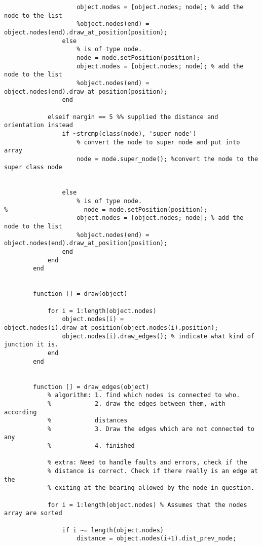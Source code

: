 \begin{lstlisting}
                    object.nodes = [object.nodes; node]; % add the node to the list
                    %object.nodes(end) = object.nodes(end).draw_at_position(position);
                else
                    % is of type node.
                    node = node.setPosition(position);
                    object.nodes = [object.nodes; node]; % add the node to the list
                    %object.nodes(end) = object.nodes(end).draw_at_position(position);
                end
                
            elseif nargin == 5 %% supplied the distance and orientation instead
                if ~strcmp(class(node), 'super_node')
                    % convert the node to super node and put into array
                    node = node.super_node(); %convert the node to the super class node
                    
                                    
                else
                    % is of type node.
%                     node = node.setPosition(position);
                    object.nodes = [object.nodes; node]; % add the node to the list
                    %object.nodes(end) = object.nodes(end).draw_at_position(position);
                end 
            end
        end
              
                
        function [] = draw(object)
            
            for i = 1:length(object.nodes)
                object.nodes(i) = object.nodes(i).draw_at_position(object.nodes(i).position);
                object.nodes(i).draw_edges(); % indicate what kind of junction it is.
            end
        end
        
        
        function [] = draw_edges(object)
            % algorithm: 1. find which nodes is connected to who.
            %            2. draw the edges between them, with according
            %            distances
            %            3. Draw the edges which are not connected to any
            %            4. finished
            
            % extra: Need to handle faults and errors, check if the
            % distance is correct. Check if there really is an edge at the
            % exiting at the bearing allowed by the node in question.
            
            for i = 1:length(object.nodes) % Assumes that the nodes array are sorted 
           
                if i ~= length(object.nodes)
                    distance = object.nodes(i+1).dist_prev_node;
                    

\end{lstlisting}
